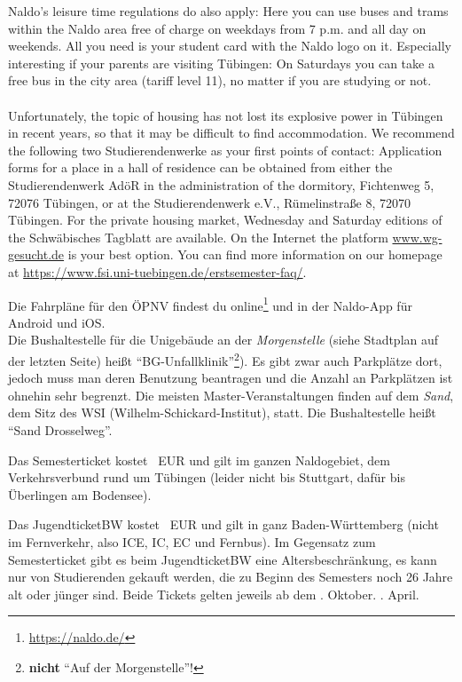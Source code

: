     Naldo's leisure time regulations do also apply: Here you can use buses and trams within the Naldo area free of charge on weekdays from 7 p.m. and all day on weekends. All you need is your student card with the Naldo logo on it.
    Especially interesting if your parents are visiting Tübingen: On Saturdays you can take a free bus in the city area (tariff level 11), no matter if you are studying or not.\\ \\

    Unfortunately, the topic of housing has not lost its explosive power in Tübingen in recent years,
    so that it may be difficult to find accommodation. We recommend the following two Studierendenwerke as your first points of contact:
    Application forms for a place in a hall of residence can be obtained from either the Studierendenwerk AdöR in the administration of the dormitory,
    Fichtenweg 5, 72076 Tübingen, or at the Studierendenwerk e.V., Rümelinstraße 8, 72070 Tübingen. For the private housing market, Wednesday and Saturday
    editions of the Schwäbisches Tagblatt are available.
    On the Internet the platform \url{www.wg-gesucht.de} is your best option.
    You can find more information on our homepage at \url{https://www.fsi.uni-tuebingen.de/erstsemester-faq/}.

\else

    Die Fahrpläne für den ÖPNV  findest du online\footnote{\url{https://naldo.de/}} und in der Naldo-App für Android und iOS.\\
    Die Bushaltestelle für die Unigebäude an der \emph{Morgenstelle} (siehe Stadtplan auf der letzten Seite) heißt "`BG-Unfallklinik"'\footnote{\textbf{nicht} "`Auf der Morgenstelle"'!}). Es gibt zwar auch Parkplätze dort,
    jedoch muss man deren Benutzung beantragen und die Anzahl an Parkplätzen ist ohnehin sehr begrenzt.
    \ifmaster
    Die meisten Master-Veranstaltungen finden auf dem \emph{Sand}, dem Sitz des WSI (Wilhelm-Schickard-Institut), statt. Die Bushaltestelle heißt "`Sand Drosselweg"'.
    \fi
    
    Das Semesterticket kostet \semesterticketpreis~EUR und gilt im ganzen Naldogebiet, dem Verkehrsverbund rund um Tübingen (leider nicht bis Stuttgart, dafür bis Überlingen am Bodensee).
    
    Das JugendticketBW kostet \jugendticketbwpreis~EUR und gilt in ganz Baden-Württemberg (nicht im Fernverkehr, also ICE, IC, EC und Fernbus). Im Gegensatz zum Semesterticket gibt es beim JugendticketBW eine Altersbeschränkung,
    es kann nur von Studierenden gekauft werden, die zu Beginn des Semesters noch 26 Jahre alt oder jünger sind.
    Beide Tickets gelten jeweils ab dem
    . Oktober.
    \fi
    . April.
    \fi

